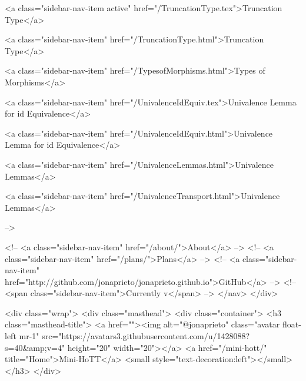       
    
      
        
          <a class="sidebar-nav-item active" href="/TruncationType.tex">Truncation Type</a>
        
      
    
      
        
          <a class="sidebar-nav-item" href="/TruncationType.html">Truncation Type</a>
        
      
    
      
        
          <a class="sidebar-nav-item" href="/TypesofMorphisms.html">Types of Morphisms</a>
        
      
    
      
        
          <a class="sidebar-nav-item" href="/UnivalenceIdEquiv.tex">Univalence Lemma for id Equivalence</a>
        
      
    
      
        
          <a class="sidebar-nav-item" href="/UnivalenceIdEquiv.html">Univalence Lemma for id Equivalence</a>
        
      
    
      
        
          <a class="sidebar-nav-item" href="/UnivalenceLemmas.html">Univalence Lemmas</a>
        
      
    
      
        
          <a class="sidebar-nav-item" href="/UnivalenceTransport.html">Univalence Lemmas</a>
        
      
     -->

    <!-- <a class="sidebar-nav-item" href="/about/">About</a> -->
    <!-- <a class="sidebar-nav-item" href="/plans/">Plans</a> -->
    <!-- <a class="sidebar-nav-item" href="http://github.com/jonaprieto/jonaprieto.github.io">GitHub</a> -->
    <!-- <span class="sidebar-nav-item">Currently v</span> -->
  </nav>
</div>

    <div class="wrap">
      <div class="masthead">
        <div class="container">
          <h3 class="masthead-title">
            <a href=""><img alt="@jonaprieto" class="avatar float-left mr-1" src="https://avatars3.githubusercontent.com/u/1428088?s=40&amp;v=4" height="20" width="20"></a>
            <a href="/mini-hott/" title="Home">Mini-HoTT</a>
            <small style="text-decoration:left"></small>
          </h3>
        </div>
      
